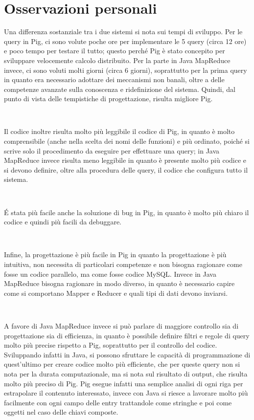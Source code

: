 \documentclass[11pt]{article} %
\begin{document}
\section{Osservazioni personali}

Una differenza sostanziale tra i due sistemi si nota sui tempi di sviluppo. Per le query in Pig, ci sono volute poche ore per implementare le 5 query (circa 12 ore) e poco tempo per testare il tutto; questo perché Pig è stato concepito per sviluppare velocemente calcolo distribuito. Per la parte in Java MapReduce invece, ci sono voluti molti giorni (circa 6 giorni), soprattutto per la prima query in quanto era necessario adottare dei meccanismi non banali, oltre a delle competenze avanzate sulla conoscenza e ridefinizione del sistema. Quindi, dal punto di vista delle tempistiche di progettazione, risulta migliore Pig.

~

Il codice inoltre risulta molto più leggibile il codice di Pig, in quanto è molto comprensibile (anche nella scelta dei nomi delle funzioni) e più ordinato, poiché si scrive solo il procedimento da eseguire per effettuare una query; in Java MapReduce invece risulta meno leggibile in quanto è presente molto più codice e si devono definire, oltre alla procedura delle query, il codice che configura tutto il sistema.

~

\'E stata più facile anche la soluzione di bug in Pig, in quanto è molto più chiaro il codice e quindi più facili da debuggare.

~

Infine, la progettazione è più facile in Pig in quanto la progettazione è più intuitiva, non necessita di particolari competenze e non bisogna ragionare come fosse un codice parallelo, ma come fosse codice MySQL. Invece in Java MapReduce bisogna ragionare in modo diverso, in quanto è necessario capire come si comportano Mapper e Reducer e quali tipi di dati devono inviarsi.

~

A favore di Java MapReduce invece si può parlare di maggiore controllo sia di progettazione sia di efficienza, in quanto è possibile definire filtri e regole di query molto più precise rispetto a Pig, soprattutto per il controllo del codice. Sviluppando infatti in Java, si possono sfruttare le capacità di programmazione di quest'ultimo per creare codice molto più efficiente, che per queste query non si nota per la durata computazionale, ma si nota sul risultato di output, che risulta molto più preciso di Pig. Pig esegue infatti una semplice analisi di ogni riga per estrapolare il contenuto interessato, invece con Java si riesce a lavorare molto più facilmente con ogni campo delle entry trattandole come stringhe e poi come oggetti nel caso delle chiavi composte.
\end{document}
